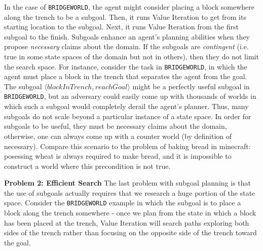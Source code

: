 \documentclass[]{article}
\begin{document}
In the case of \texttt{BRIDGEWORLD}, the agent might consider placing
a block somewhere along the trench to be a subgoal. Then, it runs
Value Iteration to get from its starting location to the subgoal.
Next, it runs Value Iteration from the first subgoal to the finish.
Subgoals enhance an agent's planning abilities when they propose {\it
  necessary} claims about the domain. If the subgoals are {\it
  contingent} (i.e. true in some state spaces of the domain but not in
others), then they do not limit the search space. For instance,
consider the task in \texttt{BRIDGEWORLD}, in which the agent must
place a block in the trench that separates the agent from the goal.
The subgoal $\langle blockInTrench, reachGoal\rangle$ might be a
perfectly useful subgoal in \texttt{BRIDGEWORLD}, but an adversary
could easily come up with thousands of worlds in which such a subgoal
would completely derail the agent's planner. Thus, many subgoals do
not scale beyond a particular instance of a state space. In order for
subgoals to be useful, they must be necessary claims about the domain,
otherwise, one can always come up with a counter world (by definition
of necessary).  Compare this scenario to the problem of baking bread
in minecraft: posessing wheat is always required to make bread, and it
is impossible to construct a world where this precondition is not
true.

{\bf Problem 2: Efficient Search} The last problem with subgoal
planning is that the use of subgoals actually requires that we
research a huge portion of the state space. Consider the
\texttt{BRIDGEWORLD} example in which the subgoal is to place a block
along the trench somewhere - once we plan from the state in which a
block has been placed at the trench, Value Iteration will search paths
exploring both sides of the trench rather than focusing on the
opposite side of the trench toward the goal.
\end{document}
